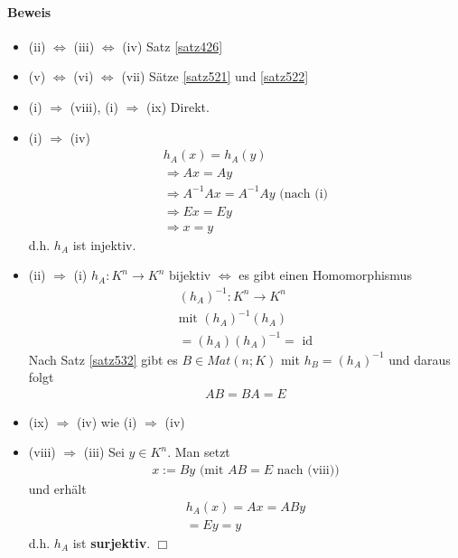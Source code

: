 \documentclass[11pt]{report}
\newcommand*\f[1] {\textbf{#1}}
\begin{document}
\paragraph{Beweis}
\begin{itemize}
 \item (ii) $\Leftrightarrow$ (iii) $\Leftrightarrow$ (iv) Satz \ref{satz426}
 \item (v) $\Leftrightarrow$ (vi) $\Leftrightarrow$ (vii) Sätze \ref{satz521} und \ref{satz522}
 \item (i) $\Rightarrow$ (viii), (i) $\Rightarrow$ (ix) Direkt.
 \item (i) $\Rightarrow$ (iv)
\begin{align}
h_A (x) = h_A (y) \\
\Rightarrow Ax = Ay \\
\Rightarrow A^{-1}Ax = A^{-1}Ay \text{ (nach (i)}\\
\Rightarrow Ex = Ey \\
\Rightarrow x = y
\end{align}
d.h. $h_A$ ist injektiv.
 \item (ii) $\Rightarrow$ (i) $h_A : K^n \rightarrow K^n$ bijektiv $\Leftrightarrow$ es gibt einen Homomorphismus
\begin{align}
 (h_A)^{-1} : K^n \rightarrow K^n \\
\text{mit } (h_A)^{-1}(h_A) \\
= (h_A)(h_A)^{-1} = \text{ id}
\end{align}
Nach Satz \ref{satz532} gibt es $B \in Mat(n;K)$ mit $h_B = (h_A)^{-1}$ und daraus folgt
\begin{align}
 AB = BA = E
\end{align}
 \item (ix) $\Rightarrow$ (iv) wie (i) $\Rightarrow$ (iv)
 \item (viii) $\Rightarrow$ (iii) Sei $y \in K^n$. Man setzt
\begin{align}
 x := By \text{ (mit } AB = E \text{ nach (viii))}
\end{align}
und erhält 
\begin{align}
 h_A(x) = Ax = ABy \\
 = Ey = y
\end{align}
d.h. $h_A$ ist \f{surjektiv}.  \hfill $\Box$
\end{itemize}
\end{document}
